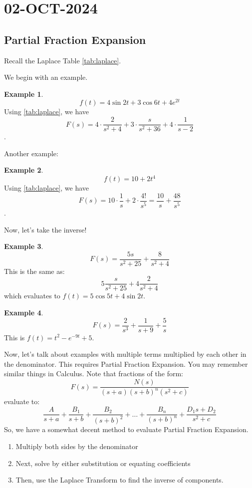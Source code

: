 \documentclass{article}
\theoremstyle{definition}
\newtheorem{example}{Example}[section]
\begin{document}
\section{02-OCT-2024}
\subsection{Partial Fraction Expansion}

Recall the Laplace Table \ref{tab:laplace}. 

We begin with an example. 
\begin{example}
    \[ f(t) = 4 \sin{2t} + 3 \cos{6t} + 4 e^{2t}  \]
Using \ref{tab:laplace}, we have \[F(s) = 4 \cdot \frac{2}{s^2+4} +  3 \cdot \frac{s}{s^2+36} + 4 \cdot \frac{1}{s-2}\]. 
\end{example}
Another example:

\begin{example}
    \[ f(t) = 10 + 2t^4  \]
Using \ref{tab:laplace}, we have \[F(s) = 10 \cdot \frac{1}{s} +  2 \cdot \frac{4!}{s^5} = \frac{10}{s} + \frac{48}{s^5}\]. 
\end{example}

Now, let's take the inverse!
\begin{example}
    \[ F(s) = \frac{5s}{s^2+25} + \frac{8}{s^2+4}  \]
This is the same as:
\[
    5\frac{s}{s^2+25} + 4\frac{2}{s^2+4}
\]
which evaluates to $f(t) = 5\cos{5t} + 4\sin{2t}$.
\end{example}

\begin{example}
    \[ F(s) = \frac{2}{s^3} + \frac{1}{s+9} + \frac{5}{s}  \]
This is $f(t) = t^2 - e^{-9t} + 5$.
\end{example}
Now, let's talk about examples with multiple terms multiplied by each other in the denominator. This requires Partial Fraction Expansion. You may remember similar things in Calculus. 
Note that fractions of the form:
\[F(s) = \frac{N(s)}{(s+a)(s+b)^n(s^2+c)} \] 
evaluate to:
\[\frac{A}{s+a} + \frac{B_1}{s+b} + \frac{B_2}{(s+b)^2} + \dots + \frac{B_n}{(s+b)^n} + \frac{D_1s + D_2}{s^2+c}\]  
So, we have a somewhat decent method to evaluate Partial Fraction Expansion.
\begin{enumerate}
    \item Multiply both sides by the denominator
    \item Next, solve by either substitution or equating coefficients
    \item Then, use the Laplace Transform to find the inverse of components. 
\end{enumerate}
\end{document}
